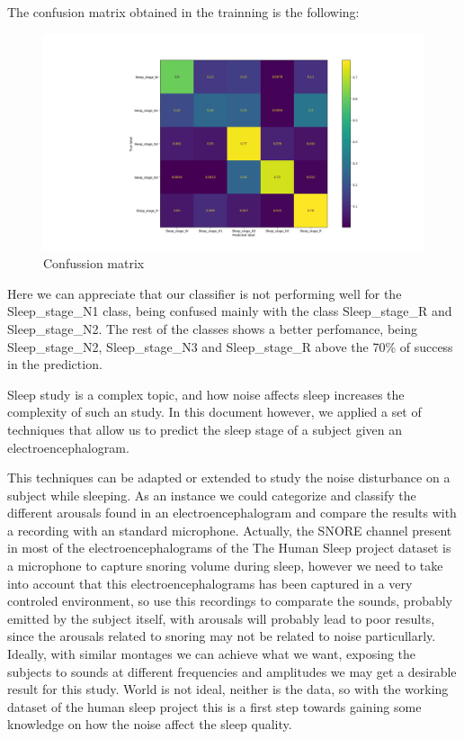 The confusion matrix obtained in the trainning is the following:

\begin{figure}[H]
\hspace*{-4cm}\includegraphics[scale=.5]{figs/cm.png}
\caption{Confussion matrix}
\label{fig4}
\end{figure}

Here we can appreciate that our classifier is not performing well for the Sleep\_stage\_N1 class, being confused mainly with the class Sleep\_stage\_R and Sleep\_stage\_N2. The rest of the classes shows a better perfomance, being Sleep\_stage\_N2, Sleep\_stage\_N3 and Sleep\_stage\_R above the 70\% of success in the prediction.

Sleep study is a complex topic, and how noise affects sleep increases the complexity of such an study. In this document however, we applied a set of techniques that allow us to predict the sleep stage of a subject given an electroencephalogram. 

This techniques can be adapted or extended to study the noise disturbance on a subject while sleeping. As an instance we could categorize and classify the different arousals found in an electroencephalogram and compare the results with a recording with an standard microphone. Actually, the SNORE channel present in most of the electroencephalograms of the The Human Sleep project dataset is a microphone to capture snoring volume during sleep, however we need to take into account that this electroencephalograms has been captured in a very controled environment, so use this recordings to comparate the sounds, probably emitted by the subject itself, with arousals will probably lead to poor results, since the arousals related to snoring may not be related to noise particullarly. Ideally, with similar montages we can achieve what we want, exposing the subjects to sounds at different frequencies and amplitudes we may get a desirable result for this study. World is not ideal, neither is the data, so with the working dataset of the human sleep project this is a first step towards gaining some knowledge on how the noise affect the sleep quality.

